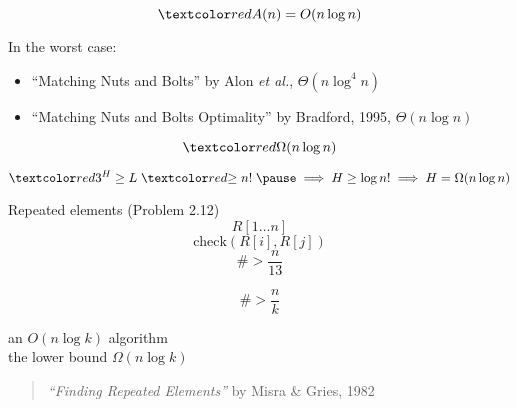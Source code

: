 \begin{frame}{}
  \centerline{}

  \pause
  \centerline{}

  \pause
  \[
    \red{A(n)} = O(n \log n)
  \]

  \pause
  \begin{alertblock}{In the worst case:}
    \begin{itemize}
      \item ``Matching Nuts and Bolts'' by Alon \emph{et al.}, $\Theta(n \log^4 n)$
      \item ``Matching Nuts and Bolts Optimality'' by Bradford, 1995, $\Theta(n \log n)$ 
    \end{itemize}
  \end{alertblock}
\end{frame}

\begin{frame}{}

  \[
    \red{\Omega(n \log n)}
  \]

  \pause
  \[
    \red{3^{H}} \ge L \;\red{\ge n!}\; \pause \implies H \ge \log n! \implies H = \Omega(n \log n)
  \]
\end{frame}

\begin{frame}{Repeated elements (Problem 2.12)}
  \[
    R[1 \dots n]
  \]
  \[
    \text{check}(R[i], R[j])
  \]
  \[
    \# > \frac{n}{13}
  \]

  \pause
  \vspace{0.30cm}
  \[
    \# > \frac{n}{k}
  \]

  \begin{center}
    an $O(n \log k)$ algorithm \\
    the lower bound $\Omega(n \log k)$
  \end{center}

  \begin{quote}
    \centering
    {\it ``Finding Repeated Elements''} by Misra \& Gries, 1982
  \end{quote}
\end{frame}
